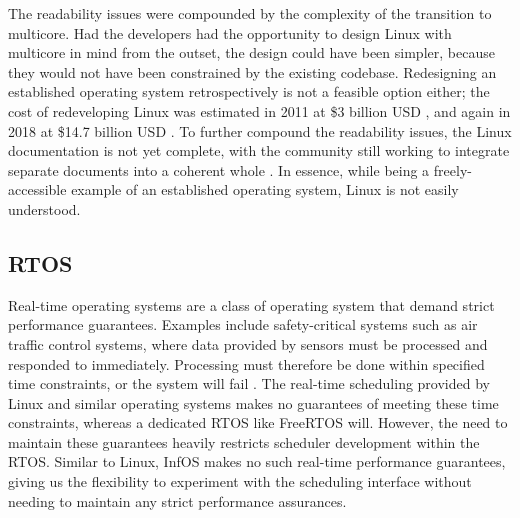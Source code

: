 \documentclass[bsc,frontabs,singlespacing,parskip,deptreport]{infthesis}
\begin{document}
The readability issues were compounded by the complexity of the transition to multicore. Had the developers had the opportunity to design Linux with multicore in mind from the outset, the design could have been simpler, because they would not have been constrained by the existing codebase. Redesigning an established operating system retrospectively is not a feasible option either; the cost of redeveloping Linux was estimated in 2011 at \$3 billion USD \cite{linux-kernel-cost}, and again in 2018 at \$14.7 billion USD \cite{cost-to-redev}. To further compound the readability issues, the Linux documentation is not yet complete, with the community still working to integrate separate documents into a coherent whole \cite{linux-docs}. In essence, while being a freely-accessible example of an established operating system, Linux is not easily understood.

\subsection{RTOS}
Real-time operating systems are a class of operating system that demand strict performance guarantees. Examples include safety-critical systems such as air traffic control systems, where data provided by sensors must be processed and responded to immediately. Processing must therefore be done within specified time constraints, or the system will fail \cite{silberschatz}. The real-time scheduling provided by Linux and similar operating systems makes no guarantees of meeting these time constraints, whereas a dedicated RTOS like FreeRTOS \cite{free-rtos} will. However, the need to maintain these guarantees heavily restricts scheduler development within the RTOS. Similar to Linux, InfOS makes no such real-time performance guarantees, giving us the flexibility to experiment with the scheduling interface without needing to maintain any strict performance assurances.
\end{document}
